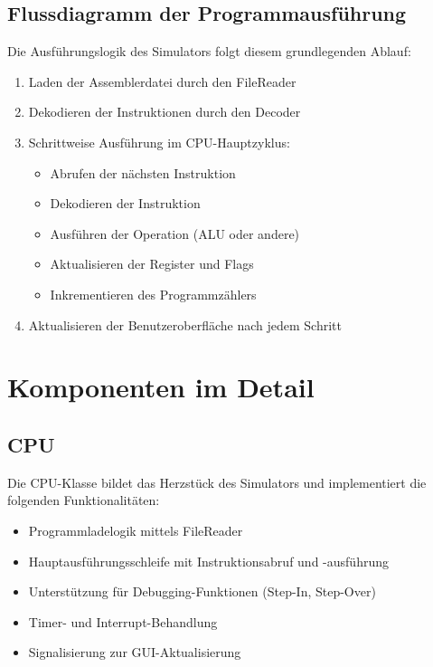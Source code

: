 \documentclass[a4paper,11pt]{report}
\begin{document}
\section{Flussdiagramm der Programmausführung}
Die Ausführungslogik des Simulators folgt diesem grundlegenden Ablauf:

\begin{enumerate}
    \item Laden der Assemblerdatei durch den FileReader
    \item Dekodieren der Instruktionen durch den Decoder
    \item Schrittweise Ausführung im CPU-Hauptzyklus:
        \begin{itemize}
            \item Abrufen der nächsten Instruktion
            \item Dekodieren der Instruktion
            \item Ausführen der Operation (ALU oder andere)
            \item Aktualisieren der Register und Flags
            \item Inkrementieren des Programmzählers
        \end{itemize}
    \item Aktualisieren der Benutzeroberfläche nach jedem Schritt
\end{enumerate}

\chapter{Komponenten im Detail}

\section{CPU}
Die CPU-Klasse bildet das Herzstück des Simulators und implementiert die folgenden Funktionalitäten:

\begin{itemize}
    \item Programmladelogik mittels FileReader
    \item Hauptausführungsschleife mit Instruktionsabruf und -ausführung
    \item Unterstützung für Debugging-Funktionen (Step-In, Step-Over)
    \item Timer- und Interrupt-Behandlung
    \item Signalisierung zur GUI-Aktualisierung
\end{itemize}
\end{document}
